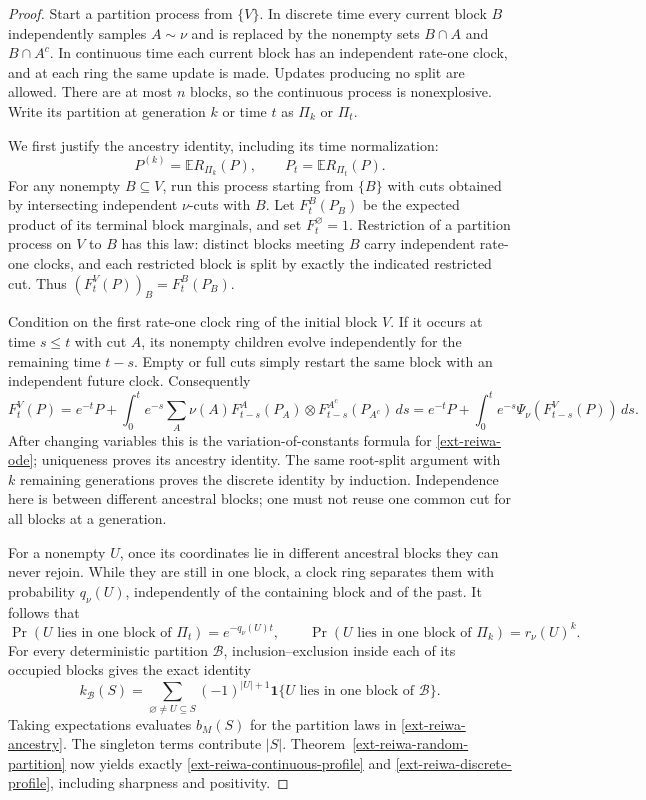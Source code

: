 \documentclass[11pt,a4paper]{article}
\theoremstyle{definition}\newtheorem{definition}[theorem]{Definition}
\theoremstyle{remark}\newtheorem{remark}[theorem]{Remark}
\numberwithin{equation}{section}
\begin{document}
\begin{proof}
Start a partition process from $\{V\}$.  In discrete time every current
block $B$ independently samples $A\sim\nu$ and is replaced by the
nonempty sets $B\cap A$ and $B\cap A^c$.  In continuous time each
current block has an independent rate-one clock, and at each ring the
same update is made.  Updates producing no split are allowed.  There
are at most $n$ blocks, so the continuous process is nonexplosive.
Write its partition at generation $k$ or time $t$ as $\Pi_k$ or
$\Pi_t$.

We first justify the ancestry identity, including its time normalization:
\begin{equation}\label{ext-reiwa-ancestry}
 P^{(k)}=\mathbb E R_{\Pi_k}(P),\qquad
 P_t=\mathbb E R_{\Pi_t}(P).
\end{equation}
For any nonempty $B\subseteq V$, run this process starting from $\{B\}$
with cuts obtained by intersecting independent $\nu$-cuts with $B$.
Let $F_t^B(P_B)$ be the expected product of its terminal block
marginals, and set $F_t^{\varnothing}=1$.
Restriction of a partition process on $V$ to $B$ has this law: distinct
blocks meeting $B$ carry independent rate-one clocks, and each
restricted block is split by exactly the indicated restricted cut.
Thus $(F_t^V(P))_B=F_t^B(P_B)$.

Condition on the first rate-one clock ring of the initial block $V$.
If it occurs at time $s\leq t$ with cut $A$, its nonempty children
evolve independently for the remaining time $t-s$.  Empty or full
cuts simply restart the same block with an independent future clock.
Consequently
\[
 F_t^V(P)=e^{-t}P+
 \int_0^t e^{-s}\sum_A\nu(A)
       F_{t-s}^{A}(P_A)\otimes F_{t-s}^{A^c}(P_{A^c})\,ds
 =e^{-t}P+\int_0^t e^{-s}\Psi_\nu(F_{t-s}^V(P))\,ds.
\]
After changing variables this is the variation-of-constants formula
for \eqref{ext-reiwa-ode}; uniqueness proves its ancestry identity.
The same root-split argument with $k$ remaining generations proves
the discrete identity by induction.  Independence here is between
different ancestral blocks; one must not reuse one common cut for
all blocks at a generation.

For a nonempty $U$, once its coordinates lie in different ancestral
blocks they can never rejoin.  While they are still in one block, a
clock ring separates them with probability $q_\nu(U)$, independently
of the containing block and of the past.  It follows that
\[
 \Pr(U\text{ lies in one block of }\Pi_t)=e^{-q_\nu(U)t},
 \qquad
 \Pr(U\text{ lies in one block of }\Pi_k)=r_\nu(U)^k.
\]
For every deterministic partition $\mathcal B$, inclusion--exclusion
inside each of its occupied blocks gives the exact identity
\[
 k_{\mathcal B}(S)=
 \sum_{\varnothing\ne U\subseteq S}(-1)^{|U|+1}
       \mathbf1\{U\text{ lies in one block of }\mathcal B\}.
\]
Taking expectations evaluates $b_M(S)$ for the partition laws in
\eqref{ext-reiwa-ancestry}.  The singleton terms contribute $|S|$.
Theorem~\ref{ext-reiwa-random-partition} now yields exactly
\eqref{ext-reiwa-continuous-profile} and
\eqref{ext-reiwa-discrete-profile}, including sharpness and positivity.
\end{proof}
\end{document}
